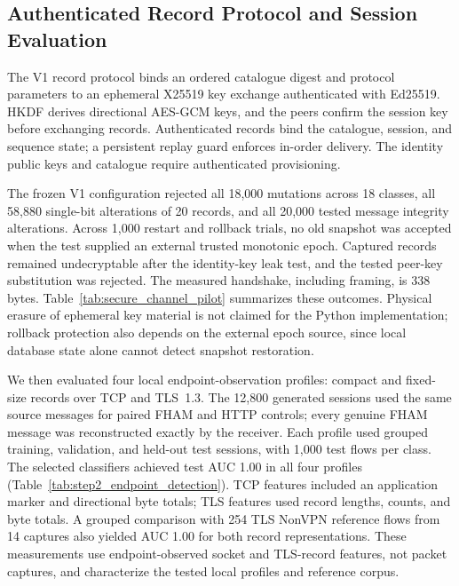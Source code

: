 \documentclass[preprint,12pt]{elsarticle}
\theoremstyle{plain}
\begin{document}
{\color{blue}
\subsection{Authenticated Record Protocol and Session Evaluation}
\label{sec:step2_security}

The V1 record protocol binds an ordered catalogue digest and protocol
parameters to an ephemeral X25519 key exchange authenticated with Ed25519.
HKDF derives directional AES-GCM keys, and the peers confirm the session key
before exchanging records. Authenticated records bind the catalogue, session,
and sequence state; a persistent replay guard enforces in-order delivery.
The identity public keys and catalogue require authenticated provisioning.

The frozen V1 configuration rejected all 18,000 mutations across 18 classes,
all 58,880 single-bit alterations of 20 records, and all 20,000 tested message
integrity alterations. Across 1,000 restart and rollback trials, no old
snapshot was accepted when the test supplied an external trusted monotonic
epoch. Captured records remained undecryptable after the identity-key leak
test, and the tested peer-key substitution was rejected. The measured
handshake, including framing, is 338 bytes. Table~\ref{tab:secure_channel_pilot}
summarizes these outcomes. Physical erasure of ephemeral key material is not
claimed for the Python implementation; rollback protection also depends on
the external epoch source, since local database state alone cannot detect
snapshot restoration.

We then evaluated four local endpoint-observation profiles: compact and
fixed-size records over TCP and TLS~1.3. The 12,800 generated sessions used
the same source messages for paired FHAM and HTTP controls; every genuine
FHAM message was reconstructed exactly by the receiver. Each profile used
grouped training, validation, and held-out test sessions, with 1,000 test
flows per class. The selected classifiers achieved test AUC 1.00 in all four
profiles (Table~\ref{tab:step2_endpoint_detection}). TCP features included
an application marker and directional byte totals; TLS features used record
lengths, counts, and byte totals. A grouped comparison with 254 TLS NonVPN
reference flows from 14 captures also yielded AUC 1.00 for both record
representations. These measurements use endpoint-observed socket and
TLS-record features, not packet captures, and characterize the tested local
profiles and reference corpus.

\begin{table}[!t]
\centering
\small
\caption{\textcolor{blue}{V1 authenticated-record and session-security test outcomes.}}
\label{tab:secure_channel_pilot}
{\color{blue}}
\end{table}

\begin{table}[!t]
\centering
\small
\caption{\textcolor{blue}{Held-out endpoint-observation detection for four local TCP/TLS profiles.}}
\label{tab:step2_endpoint_detection}
{\color{blue}}
\end{table}


}
\end{document}

